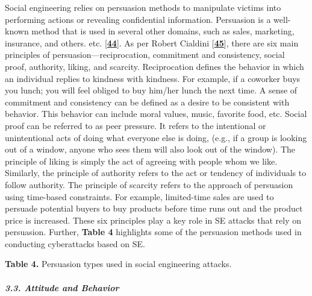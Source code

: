 Social engineering relies on persuasion methods to manipulate victims into performing actions or revealing confidential information. Persuasion is a well-known method that is used in several other domains, such as sales, marketing, insurance, and others. etc. [\href{https://www.mdpi.com/2076-3417/12/12/6042\#B44-applsci-12-06042}{\textbf{44}}]. As per Robert Cialdini [\href{https://www.mdpi.com/2076-3417/12/12/6042\#B45-applsci-12-06042}{\textbf{45}}], there are six main principles of persuasion—reciprocation, commitment and consistency, social proof, authority, liking, and scarcity. Reciprocation defines the behavior in which an individual replies to kindness with kindness. For example, if a coworker buys you lunch; you will feel obliged to buy him/her lunch the next time. A sense of commitment and consistency can be defined as a desire to be consistent with behavior. This behavior can include moral values, music, favorite food, etc. Social proof can be referred to as peer pressure. It refers to the intentional or unintentional acts of doing what everyone else is doing, (e.g., if a group is looking out of a window, anyone who sees them will also look out of the window). The principle of liking is simply the act of agreeing with people whom we like. Similarly, the principle of authority refers to the act or tendency of individuals to follow authority. The principle of scarcity refers to the approach of persuasion using time-based constraints. For example, limited-time sales are used to persuade potential buyers to buy products before time runs out and the product price is increased. These six principles play a key role in SE attacks that rely on persuasion. Further, \textbf{Table 4} highlights some of the persuasion methods used in conducting cyberattacks based on SE.

\textbf{Table 4.} Persuasion types used in social engineering attacks.
 
\paragraph{\textit{3.3. Attitude and Behavior}}

